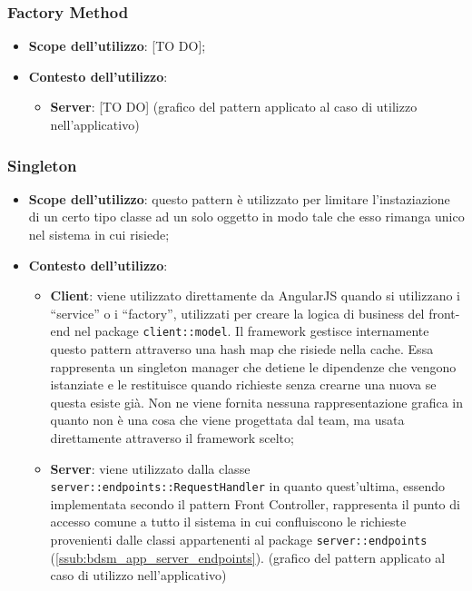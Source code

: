 	\subsubsection{Factory Method} %
	\label{ssub:factory_method}
		\begin{itemize}
			\item \textbf{Scope dell'utilizzo}: [TO DO];
			\item \textbf{Contesto dell'utilizzo}:
				\begin{itemize}
					\item \textbf{Server}: [TO DO] \newline
					[TO DO] (grafico del pattern applicato al caso di utilizzo nell'applicativo)
				\end{itemize}
		\end{itemize}


	\subsubsection{Singleton} %
	\label{ssub:singleton}
		\begin{itemize}
			\item \textbf{Scope dell'utilizzo}: questo pattern è utilizzato per limitare l'instaziazione di un certo tipo classe ad un solo oggetto in modo tale che esso rimanga unico nel sistema in cui risiede;
			\item \textbf{Contesto dell'utilizzo}:
				\begin{itemize}
					\item \textbf{Client}: viene utilizzato direttamente da AngularJS quando si utilizzano i ``service'' o i ``factory'', utilizzati per creare la logica di business del front-end nel package \texttt{client::model}. Il framework gestisce internamente questo pattern attraverso una hash map che risiede nella cache. Essa rappresenta un singleton manager che detiene le dipendenze che vengono istanziate e le restituisce quando richieste senza crearne una nuova se questa esiste già. \newline
					Non ne viene fornita nessuna rappresentazione grafica in quanto non è una cosa che viene progettata dal team, ma usata direttamente attraverso il framework scelto;
					\item \textbf{Server}: viene utilizzato dalla classe \texttt{server::endpoints::RequestHandler} in quanto quest'ultima, essendo implementata secondo il pattern Front Controller, rappresenta il punto di accesso comune a tutto il sistema in cui confluiscono le richieste provenienti dalle classi appartenenti al package \texttt{server::endpoints} (\ref{ssub:bdsm_app_server_endpoints}). \newline
					[TO DO] (grafico del pattern applicato al caso di utilizzo nell'applicativo)
				\end{itemize}
		\end{itemize}
